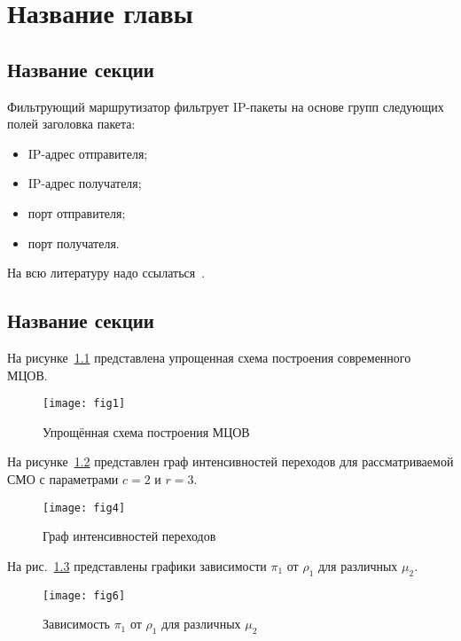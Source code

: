 \chapter{Название главы}
\label{chap1}

\section{Название секции}
\label{chap1:sec1}

% 
Фильтрующий маршрутизатор фильтрует IP-пакеты на основе групп
следующих полей заголовка пакета:

\begin{itemize}
\item IP-адрес отправителя;
\item IP-адрес получателя;
\item порт отправителя;
\item порт получателя.
\end{itemize}

На всю литературу надо ссылаться~\cite{medvedovsky:1997:ataka, romanets:security}.

\section{Название секции}
\label{chap1:sec2}

%
На рисунке~\ref{fig1} представлена упрощенная схема построения современного МЦОВ.

\begin{figure}
 \centerline{\texttt{[image: fig1]}}
 \caption{Упрощённая схема построения МЦОВ}
\label{fig1}
\end{figure}

На рисунке~\ref{fig4} представлен граф интенсивностей переходов для рассматриваемой СМО с параметрами \(c = 2\) и \(r = 3\).

\begin{figure}
 \centerline{\texttt{[image: fig4]}}
 \caption{Граф интенсивностей переходов}
\label{fig4}
\end{figure}

На рис.~\ref{fig6} представлены графики зависимости \(\pi _1\) от \(\rho _1\) для различных \(\mu _2\).

\begin{figure}
\centerline{\texttt{[image: fig6]}}
\caption{Зависимость \(\pi _1\) от \(\rho _1\) для различных \(\mu _2\)}
\label{fig6}
\end{figure}

